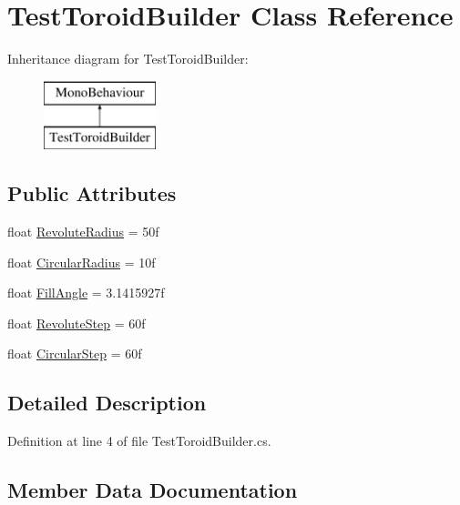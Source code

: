\hypertarget{class_test_toroid_builder}{}\section{Test\+Toroid\+Builder Class Reference}
\label{class_test_toroid_builder}
Inheritance diagram for Test\+Toroid\+Builder\+:\begin{figure}[H]
\begin{center}
\leavevmode
\includegraphics[height=2.000000cm]{class_test_toroid_builder}
\end{center}
\end{figure}
\subsection*{Public Attributes}
\begin{DoxyCompactItemize}
\item 
float \mbox{\hyperlink{class_test_toroid_builder_a584e935292aef19738eaaa90ce4b1290}{Revolute\+Radius}} = 50f
\item 
float \mbox{\hyperlink{class_test_toroid_builder_a2b5d9819fc552ec1c7943c4bc94995d2}{Circular\+Radius}} = 10f
\item 
float \mbox{\hyperlink{class_test_toroid_builder_aec399be1f24a4fbfb2ccb6b5d773aad3}{Fill\+Angle}} = 3.\+1415927f
\item 
float \mbox{\hyperlink{class_test_toroid_builder_ab071f202269896002b33707e4c246b03}{Revolute\+Step}} = 60f
\item 
float \mbox{\hyperlink{class_test_toroid_builder_af618b2645e5d67e11c0b3941ed20ca79}{Circular\+Step}} = 60f
\end{DoxyCompactItemize}


\subsection{Detailed Description}


Definition at line 4 of file Test\+Toroid\+Builder.\+cs.



\subsection{Member Data Documentation}
\mbox{\label{class_test_toroid_builder_a2b5d9819fc552ec1c7943c4bc94995d2}} 
